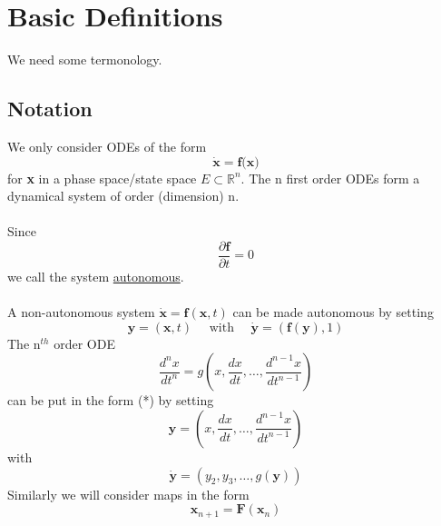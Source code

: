 \documentclass{article}
\begin{document}
\section{Basic Definitions}
We need some termonology.
\subsection{Notation}
We only consider ODEs of the form 
\begin{equation}\tag{*}
\dot{\textbf{x}} = \textbf{f(x)}
\end{equation}
for \textbf{x} in a phase space/state space $E \subset \mathbb{R}^{n}$.
The n first order ODEs form a dynamical system of order (dimension) n.
\\
\\
Since
\[ \frac{\partial \textbf{f} } { \partial t} = 0 \]
 we call the system \underline{autonomous}.
\\
\\
A non-autonomous system $\dot{\textbf{x}} = \textbf{f}(\textbf{x} ,t) $ can be
made autonomous by setting
\[ \textbf{y} = ( \textbf{x},t) \quad \mbox{ with } \quad \dot{\textbf{y}} = ( \textbf{f}(\textbf{y}),1) \]
The n$^{th}$ order ODE
\[ \frac{d ^n x}{d t^n} = g \left( x , \frac{d x}{d t} , \dots , \frac{d^{n-1} x}{d t^{n-1}} \right) \]
can be put in the form (*) by setting
\[ \textbf{y} =  \left( x , \frac{d x}{d t} , \dots , \frac{d^{n-1} x}{d t^{n-1}} \right) \]
with 
\[ \dot{\textbf{y}} =  \left( y_2 , y_3 , \dots , g( \textbf{y}) \right) \]
Similarly we will consider maps in the form
\[ \textbf{x}_{n+1} = \textbf{F}(\textbf{x}_n) \]
\end{document}
